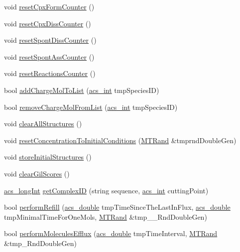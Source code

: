 \begin{DoxyCompactItemize}
\item 
void \hyperlink{a00013_a4cf4413f3028f8c5e33991ad5ba18e21}{reset\+Cpx\+Form\+Counter} ()
\item 
void \hyperlink{a00013_a987dc7b9f211f34564343ee0eaa20dc1}{reset\+Cpx\+Diss\+Counter} ()
\item 
void \hyperlink{a00013_a9c22cb9b69207398e35c9c155e2e35ce}{reset\+Spont\+Diss\+Counter} ()
\item 
void \hyperlink{a00013_a98baed580212dad8ef48a22bfe7e1295}{reset\+Spont\+Ass\+Counter} ()
\item 
void \hyperlink{a00013_a5c8713237992b28c39199a7aea3f9ea0}{reset\+Reactions\+Counter} ()
\item 
bool \hyperlink{a00013_a7981c34d16c0b1e9e6ca3ea69aa3a8a3}{add\+Charge\+Mol\+To\+List} (\hyperlink{a00050_a8d277355641a098190360234e2ebde35}{acs\+\_\+int} tmp\+Species\+I\+D)
\item 
bool \hyperlink{a00013_aa4830018af0b99eddefcdefad877b305}{remove\+Charge\+Mol\+From\+List} (\hyperlink{a00050_a8d277355641a098190360234e2ebde35}{acs\+\_\+int} tmp\+Species\+I\+D)
\item 
void \hyperlink{a00013_aa860227725dbe5b0251a25f440773161}{clear\+All\+Structures} ()
\item 
void \hyperlink{a00013_ad8000316befe74598a123bdcd7024697}{reset\+Concentration\+To\+Initial\+Conditions} (\hyperlink{a00015}{M\+T\+Rand} \&tmprnd\+Double\+Gen)
\item 
void \hyperlink{a00013_a7fc3937fb586db93c33f7f091dc99626}{store\+Initial\+Structures} ()
\item 
void \hyperlink{a00013_aa33d7b81db9632c8ba1f9ce3f362df8e}{clear\+Gil\+Scores} ()
\item 
\hyperlink{a00050_a19319d75f02db4308bc5c0026d98cd85}{acs\+\_\+long\+Int} \hyperlink{a00013_aa88b64fa5005973926a121f1aa46770d}{get\+Complex\+I\+D} (string sequence, \hyperlink{a00050_a8d277355641a098190360234e2ebde35}{acs\+\_\+int} cutting\+Point)
\item 
bool \hyperlink{a00013_a8a53821ad1675b0da50591616aac3b74}{perform\+Refill} (\hyperlink{a00050_ab776853a005fcbf56af0424a2a4dd607}{acs\+\_\+double} tmp\+Time\+Since\+The\+Last\+In\+Flux, \hyperlink{a00050_ab776853a005fcbf56af0424a2a4dd607}{acs\+\_\+double} tmp\+Minimal\+Time\+For\+One\+Mols, \hyperlink{a00015}{M\+T\+Rand} \&tmp\+\_\+\+\_\+\+Rnd\+Double\+Gen)
\item 
bool \hyperlink{a00013_acbbcdb4c77231e9ffa4c169e0caa0d0c}{perform\+Molecules\+Efflux} (\hyperlink{a00050_ab776853a005fcbf56af0424a2a4dd607}{acs\+\_\+double} tmp\+Time\+Interval, \hyperlink{a00015}{M\+T\+Rand} \&tmp\+\_\+\+Rnd\+Double\+Gen)

\end{DoxyCompactItemize}
